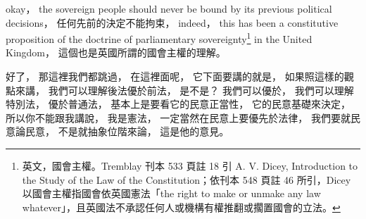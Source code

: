 \hypertarget{w02:cue:2023}{}okay，
\hypertarget{w02:cue:2024}{}the sovereign people should never be bound by its previous political decisions，
\hypertarget{w02:cue:2025}{}任何先前的決定不能拘束，
\hypertarget{w02:cue:2026}{}indeed，
\hypertarget{w02:cue:2027}{}this has been a constitutive proposition of the doctrine of parliamentary sovereignty\footnote{英文，國會主權。Tremblay 刊本 533 頁註 18 引 A. V. Dicey, Introduction to the Study of the Law of the Constitution；依刊本 548 頁註 46 所引，Dicey 以國會主權指國會依英國憲法「the right to make or unmake any law whatever」，且英國法不承認任何人或機構有權推翻或擱置國會的立法。} in the United Kingdom，
\hypertarget{w02:cue:2028}{}這個也是英國所謂的國會主權的理解。

\hypertarget{w02:cue:2029}{}好了，
\hypertarget{w02:cue:2030}{}那這裡我們都跳過，
\hypertarget{w02:cue:2031}{}在這裡面呢，
\hypertarget{w02:cue:2032}{}它下面要講的就是，
\hypertarget{w02:cue:2033}{}如果照這樣的觀點來講，
\hypertarget{w02:cue:2034}{}我們可以理解後法優於前法，
\hypertarget{w02:cue:2035}{}是不是？
\hypertarget{w02:cue:2036}{}我們可以優於，
\hypertarget{w02:cue:2037}{}我們可以理解特別法，
\hypertarget{w02:cue:2038}{}優於普通法，
\hypertarget{w02:cue:2039}{}基本上是要看它的民意正當性，
\hypertarget{w02:cue:2040}{}它的民意基礎來決定，
\hypertarget{w02:cue:2041}{}所以你不能跟我講說，
\hypertarget{w02:cue:2042}{}我是憲法，
\hypertarget{w02:cue:2043}{}一定當然在民意上要優先於法律，
\hypertarget{w02:cue:2044}{}我們要就民意論民意，
\hypertarget{w02:cue:2045}{}不是就抽象位階來論，
\hypertarget{w02:cue:2046}{}這是他的意見。

